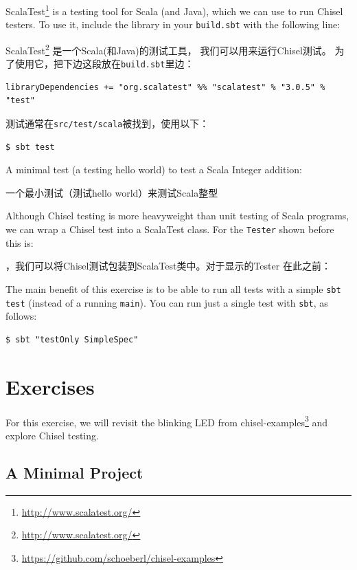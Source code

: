 \documentclass[%
    10pt,
    headinclude, footexclude,
    openright, %
    notitlepage,
    cleardoubleempty,
    headsepline,
    pointlessnumbers,
    bibtotoc, idxtotoc,
    ]{scrbook}
\newcommand{\code}[1]{{\small{\texttt{#1}}}}
\newcommand{\todo}[1]{{\emph{TODO: #1}}}
\newcommand{\myref}[2]{\href{#1}{#2}}
\renewcommand{\myref}[2]{{#2}{\footnote{\url{#1}}}}
\renewcommand{\todo}[1]{}
\begin{document}
\myref{http://www.scalatest.org/}{ScalaTest} is a testing tool for Scala (and Java),
which we can use to run Chisel testers.
To use it, include the library in your \code{build.sbt} with the following line:

\myref{http://www.scalatest.org/}{ScalaTest} 是一个Scala(和Java)的测试工具，
我们可以用来运行Chisel测试。
为了使用它，把下边这段放在\code{build.sbt}里边：

\begin{verbatim}
libraryDependencies += "org.scalatest" %% "scalatest" % "3.0.5" % "test"
\end{verbatim}

\noindent 测试通常在\code{src/test/scala}被找到，使用以下：

\begin{verbatim}
$ sbt test
\end{verbatim}

\noindent A minimal test (a testing hello world) to test a Scala Integer
addition:

\noindent 一个最小测试（测试hello world）来测试Scala整型


\noindent Although Chisel testing is more heavyweight than unit testing of Scala programs,
we can wrap a Chisel test into a ScalaTest class. For the \code{Tester} shown
before this is:

，我们可以将Chisel测试包装到ScalaTest类中。对于显示的Tester
在此之前：


The main benefit of this exercise is to be able to run all tests with a simple
\code{sbt test} (instead of a running \code{main}). You can run just a single
test with \code{sbt}, as follows:

\begin{verbatim}
$ sbt "testOnly SimpleSpec"
\end{verbatim}

\section{Exercises}

For this exercise, we will revisit the blinking LED from
\myref{https://github.com/schoeberl/chisel-examples}{chisel-examples}
and explore Chisel testing. \todo{Also use the ALU example.}

\subsection{A Minimal Project}
\end{document}

